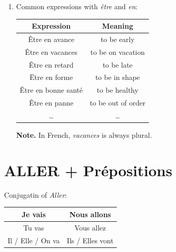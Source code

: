 \documentclass{book}
\begin{document}
\begin{enumerate}
                \item Common expressions with \textit{être} and \textit{en}:
                    \begin{center}
                        \begin{tabular}{|c|c|}
                            \hline
                            \textbf{Expression} & \textbf{Meaning}\\
                            \hline
                            Être en avance & to be early\\
                            Être en vacances & to be on vacation\\
                            Être en retard & to be late \\
                            Ëtre en forme & to be in shape \\
                            Être en bonne santé & to be healthy \\
                            Être en panne & to be out of order \\
                            \dots & \dots \\
                            \hline
                        \end{tabular}
                    \end{center}
                    \textbf{Note.} In French, \textit{vacances} is always plural.
            \end{enumerate}

    \section{ALLER + Prépositions}
        Conjugatin of \textit{Aller}:
        \begin{center}
            \begin{tabular}{|c|c|}
                \hline
                Je vais & Nous allons \\
                \hline
                Tu vas & Vous allez \\
                \hline
                Il / Elle / On va & Ils / Elles vont \\
                \hline
            \end{tabular}
        \end{center}
        
\end{document}
